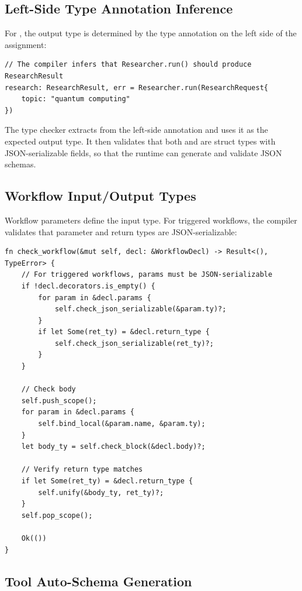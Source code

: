 \subsection{Left-Side Type Annotation Inference}

For , the output type is determined by the type annotation on the left side of the assignment:

\begin{lstlisting}
// The compiler infers that Researcher.run() should produce ResearchResult
research: ResearchResult, err = Researcher.run(ResearchRequest{
    topic: "quantum computing"
})
\end{lstlisting}

The type checker extracts  from the left-side annotation and uses it as the expected output type. It then validates that both  and  are struct types with JSON-serializable fields, so that the runtime can generate and validate JSON schemas.

\subsection{Workflow Input/Output Types}

Workflow parameters define the input type. For triggered workflows, the compiler validates that parameter and return types are JSON-serializable:

\begin{lstlisting}[language={}]
fn check_workflow(&mut self, decl: &WorkflowDecl) -> Result<(), TypeError> {
    // For triggered workflows, params must be JSON-serializable
    if !decl.decorators.is_empty() {
        for param in &decl.params {
            self.check_json_serializable(&param.ty)?;
        }
        if let Some(ret_ty) = &decl.return_type {
            self.check_json_serializable(ret_ty)?;
        }
    }

    // Check body
    self.push_scope();
    for param in &decl.params {
        self.bind_local(&param.name, &param.ty);
    }
    let body_ty = self.check_block(&decl.body)?;

    // Verify return type matches
    if let Some(ret_ty) = &decl.return_type {
        self.unify(&body_ty, ret_ty)?;
    }
    self.pop_scope();

    Ok(())
}
\end{lstlisting}

\subsection{Tool Auto-Schema Generation}

